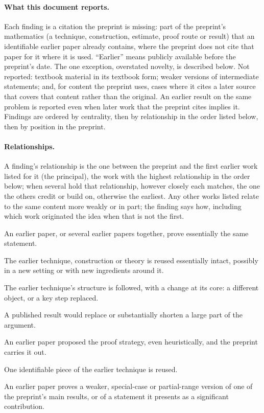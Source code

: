 \documentclass[11pt]{article}
\newcounter{finding}
\begin{document}
\paragraph{What this document reports.}
Each finding is a citation the preprint is missing: part of the preprint's
mathematics (a technique, construction, estimate, proof route or result) that
an identifiable earlier paper already contains, where the preprint does not
cite that paper for it where it is used. ``Earlier'' means publicly available
before the preprint's date. The one exception, overstated novelty, is
described below. Not reported: textbook material in its textbook form; weaker versions of
intermediate statements; and, for content the preprint uses, cases where it
cites a later source that covers that content rather than the original. An
earlier result on the same problem is reported even when later work that the
preprint cites implies it. Findings are ordered by centrality, then by relationship in
the order listed below, then by position in the preprint.

\paragraph{Relationships.}
A finding's relationship is the one between the preprint and the first
earlier work listed for it (the principal), the work with the highest relationship in the
order below; when several hold that relationship, however closely each matches,
the one the others credit or build on, otherwise the earliest. Any other works listed relate to the same content more weakly or
in part; the finding says how, including which work originated the idea when
that is not the first.
\begin{description}[leftmargin=1.5em,font=\normalfont\itshape]
\item[same result.] An earlier paper, or several earlier papers together, prove essentially the same statement.
\item[same technique.] The earlier technique, construction or theory is
reused essentially intact, possibly in a new setting or with new ingredients
around it.
\item[adapted.] The earlier technique's structure is followed, with a change
at its core: a different object, or a key step replaced.
\item[proof shortcut.] A published result would replace or substantially
shorten a large part of the argument.
\item[same route.] An earlier paper proposed the proof strategy, even
heuristically, and the preprint carries it out.
\item[fragment.] One identifiable piece of the earlier technique is reused.
\item[weaker result.] An earlier paper proves a weaker, special-case or
partial-range version of one of the preprint's main results, or of a
statement it presents as a significant contribution.
\end{description}
\end{document}
